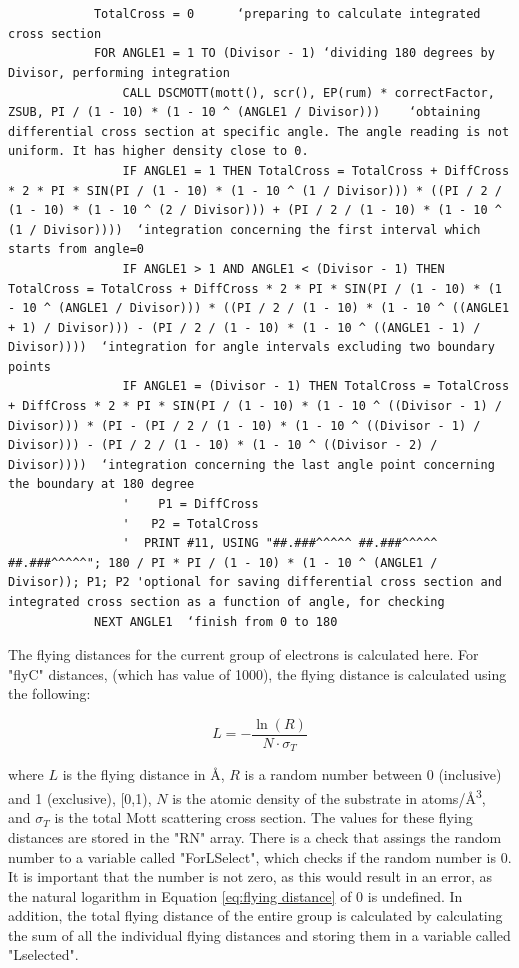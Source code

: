 \documentclass[10pt, reqno]{exam}
\begin{document}
\begin{verbatim}

            
            TotalCross = 0      ‘preparing to calculate integrated cross section 
            FOR ANGLE1 = 1 TO (Divisor - 1) ‘dividing 180 degrees by Divisor, performing integration
                CALL DSCMOTT(mott(), scr(), EP(rum) * correctFactor, ZSUB, PI / (1 - 10) * (1 - 10 ^ (ANGLE1 / Divisor)))    ‘obtaining differential cross section at specific angle. The angle reading is not uniform. It has higher density close to 0.
                IF ANGLE1 = 1 THEN TotalCross = TotalCross + DiffCross * 2 * PI * SIN(PI / (1 - 10) * (1 - 10 ^ (1 / Divisor))) * ((PI / 2 / (1 - 10) * (1 - 10 ^ (2 / Divisor))) + (PI / 2 / (1 - 10) * (1 - 10 ^ (1 / Divisor))))  ‘integration concerning the first interval which starts from angle=0
                IF ANGLE1 > 1 AND ANGLE1 < (Divisor - 1) THEN TotalCross = TotalCross + DiffCross * 2 * PI * SIN(PI / (1 - 10) * (1 - 10 ^ (ANGLE1 / Divisor))) * ((PI / 2 / (1 - 10) * (1 - 10 ^ ((ANGLE1 + 1) / Divisor))) - (PI / 2 / (1 - 10) * (1 - 10 ^ ((ANGLE1 - 1) / Divisor))))  ‘integration for angle intervals excluding two boundary points
                IF ANGLE1 = (Divisor - 1) THEN TotalCross = TotalCross + DiffCross * 2 * PI * SIN(PI / (1 - 10) * (1 - 10 ^ ((Divisor - 1) / Divisor))) * (PI - (PI / 2 / (1 - 10) * (1 - 10 ^ ((Divisor - 1) / Divisor))) - (PI / 2 / (1 - 10) * (1 - 10 ^ ((Divisor - 2) / Divisor))))  ‘integration concerning the last angle point concerning the boundary at 180 degree
                '    P1 = DiffCross
                '   P2 = TotalCross
                '  PRINT #11, USING "##.###^^^^^ ##.###^^^^^ ##.###^^^^^"; 180 / PI * PI / (1 - 10) * (1 - 10 ^ (ANGLE1 / Divisor)); P1; P2 'optional for saving differential cross section and integrated cross section as a function of angle, for checking 
            NEXT ANGLE1  ‘finish from 0 to 180
\end{verbatim}

The flying distances for the current group of electrons is calculated here. For "flyC" distances, (which has value of 1000), the flying distance is calculated using the following:

\begin{equation}
    L = -\frac{\ln(R)}{N\cdot \sigma_T}
    \label{eq:flying distance}
\end{equation}

where $L$ is the flying distance in \si{\angstrom}, $R$ is a random number between 0 (inclusive) and 1 (exclusive), [0,1), $N$ is the atomic density of the substrate in \si{atoms/\angstrom^3}, and $\sigma_T$ is the total Mott scattering cross section. The values for these flying distances are stored in the "RN" array. There is a check that assings the random number to a variable called "ForLSelect", which checks if the random number is 0. It is important that the number is not zero, as this would result in an error, as the natural logarithm in Equation \ref{eq:flying distance} of 0 is undefined. In addition, the total flying distance of the entire group is calculated by calculating the sum of all the individual flying distances and storing them in a variable called "Lselected".
\end{document}

